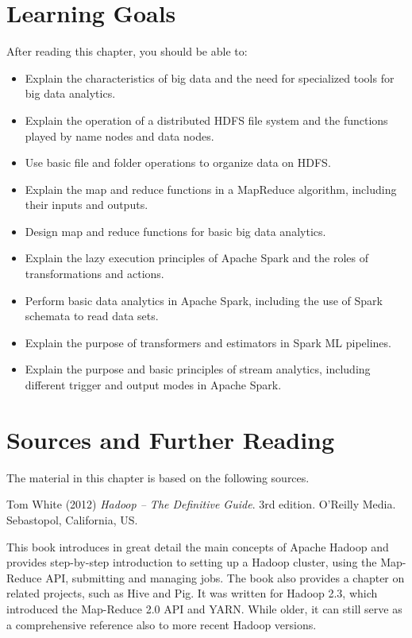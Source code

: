 %
%
\section*{Learning Goals}

After reading this chapter, you should be able to:
\begin{itemize}
    \item Explain the characteristics of big data and the need for specialized tools for big data analytics.
    \item Explain the operation of a distributed HDFS file system and the functions played by name nodes and data nodes. 
    \item Use basic file and folder operations to organize data on HDFS.
    \item Explain the map and reduce functions in a MapReduce algorithm, including their inputs and outputs.
    \item Design map and reduce functions for basic big data analytics. 
    \item Explain the lazy execution principles of Apache Spark and the roles of transformations and actions.
    \item Perform basic data analytics in Apache Spark, including the use of Spark schemata to read data sets.
    \item Explain the purpose of transformers and estimators in Spark ML pipelines.
    \item Explain the purpose and basic principles of stream analytics, including different trigger and output modes in Apache Spark.
\end{itemize}

\section*{Sources and Further Reading}

The material in this chapter is based on the following sources.

\begin{tcolorbox}[colback=alert]
Tom White (2012) \emph{Hadoop -- The Definitive Guide}. 3rd edition. O'Reilly Media. Sebastopol, California, US.
\end{tcolorbox}

This book introduces in great detail the main concepts of Apache Hadoop and provides step-by-step introduction to setting up a Hadoop cluster, using the Map-Reduce API, submitting and managing jobs. The book also provides a chapter on related projects, such as Hive and Pig. It was written for Hadoop 2.3, which introduced the Map-Reduce 2.0 API and YARN. While older, it can still serve as a comprehensive reference also to more recent Hadoop versions.

